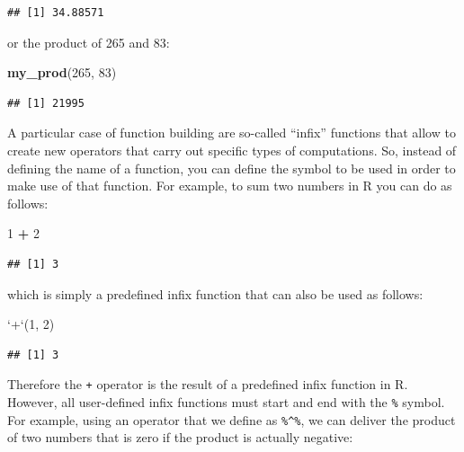 \documentclass[12pt,]{krantz}
\newenvironment{Shaded}{\begin{snugshade}}{\end{snugshade}}
\newcommand{\KeywordTok}[1]{\textcolor[rgb]{0.27,0.27,0.27}{\textbf{#1}}}
\newcommand{\DataTypeTok}[1]{\textcolor[rgb]{0.27,0.27,0.27}{#1}}
\newcommand{\DecValTok}[1]{\textcolor[rgb]{0.06,0.06,0.06}{#1}}
\newcommand{\StringTok}[1]{\textcolor[rgb]{0.5,0.5,0.5}{#1}}
\newcommand{\OperatorTok}[1]{\textcolor[rgb]{0.43,0.43,0.43}{\textbf{#1}}}
\newcommand{\NormalTok}[1]{#1}
\begin{document}
\begin{verbatim}
## [1] 34.88571
\end{verbatim}

or the product of 265 and 83:

\begin{Shaded}
\begin{Highlighting}[]
\KeywordTok{my_prod}\NormalTok{(}\DecValTok{265}\NormalTok{, }\DecValTok{83}\NormalTok{)}
\end{Highlighting}
\end{Shaded}

\begin{verbatim}
## [1] 21995
\end{verbatim}

A particular case of function building are so-called ``infix'' functions
that allow to create new operators that carry out specific types of
computations. So, instead of defining the name of a function, you can
define the symbol to be used in order to make use of that function. For
example, to sum two numbers in R you can do as follows:

\begin{Shaded}
\begin{Highlighting}[]
\DecValTok{1} \OperatorTok{+}\StringTok{ }\DecValTok{2}
\end{Highlighting}
\end{Shaded}

\begin{verbatim}
## [1] 3
\end{verbatim}

which is simply a predefined infix function that can also be used as
follows:

\begin{Shaded}
\begin{Highlighting}[]
\StringTok{`}\DataTypeTok{+}\StringTok{`}\NormalTok{(}\DecValTok{1}\NormalTok{, }\DecValTok{2}\NormalTok{)}
\end{Highlighting}
\end{Shaded}

\begin{verbatim}
## [1] 3
\end{verbatim}

Therefore the \texttt{+} operator is the result of a predefined infix
function in R. However, all user-defined infix functions must start and
end with the \texttt{\%} symbol. For example, using an operator that we
define as \texttt{\%\^{}\%}, we can deliver the product of two numbers
that is zero if the product is actually negative:
\end{document}
